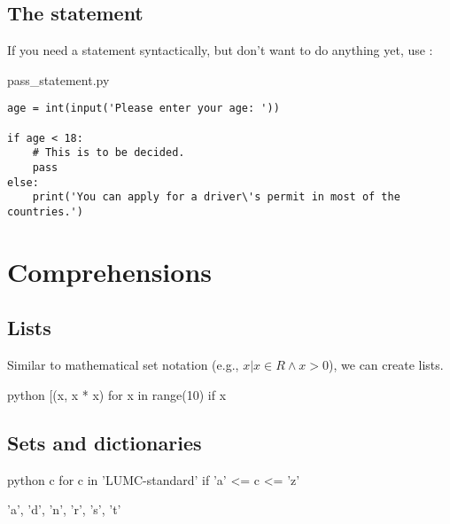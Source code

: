 \documentclass[aspectratio=1610,t]{beamer}
\begin{document}
\subsection{The  statement}
\begin{pframe}
 If you need a statement syntactically, but don't want to do anything yet, use :
 \begin{pythonfile}{pass\_statement.py}
  \begin{verbatim}
age = int(input('Please enter your age: '))

if age < 18:
    # This is to be decided.
    pass
else:
    print('You can apply for a driver\'s permit in most of the countries.')
  \end{verbatim}
 \end{pythonfile}
\end{pframe}



\section{Comprehensions}

\subsection{Lists}
\begin{pframe}
 Similar to mathematical set notation (e.g., ${x | x \in R \wedge x>0}$), we can create lists.
 \begin{ipython}
  \begin{pythonin}{python}
[(x, x * x) for x in range(10) if x %
  \end{pythonin}
  \begin{pythonout}
[(1, 1), (3, 9), (5, 25), (7, 49), (9, 81)]
  \end{pythonout}
 \end{ipython}
\end{pframe}


\subsection{Sets and dictionaries}
\begin{pframe}
 \begin{ipython}
  \begin{pythonin}{python}
{c for c in 'LUMC-standard' if 'a' <= c <= 'z'}
  \end{pythonin}
  \begin{pythonout}
{'a', 'd', 'n', 'r', 's', 't'}
  \end{pythonout}
 \end{ipython}
\end{pframe}
\end{document}
